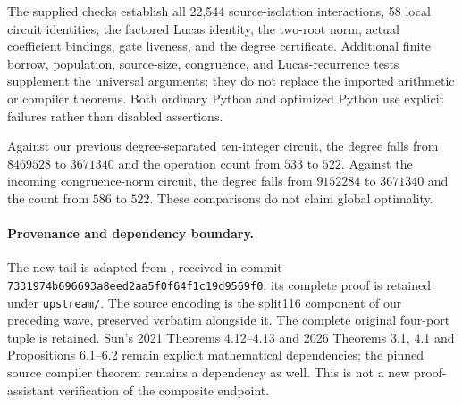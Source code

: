 The supplied checks establish all 22,544 source-isolation interactions, 58 local circuit identities, the factored Lucas identity, the two-root norm, actual coefficient bindings, gate liveness, and the degree certificate. Additional finite borrow, population, source-size, congruence, and Lucas-recurrence tests supplement the universal arguments; they do not replace the imported arithmetic or compiler theorems. Both ordinary Python and optimized Python use explicit failures rather than disabled assertions.

Against our previous degree-separated ten-integer circuit, the degree falls from $8469528$ to $3671340$ and the operation count from $533$ to $522$. Against the incoming congruence-norm circuit, the degree falls from $9152284$ to $3671340$ and the count from $586$ to $522$. These comparisons do not claim global optimality.

\paragraph{Provenance and dependency boundary.}
The new tail is adapted from , received in commit \texttt{7331974b696693a8eed2\allowbreak aa5f0f64f1c19d9569f0}; its complete proof is retained under \texttt{upstream/}. The source encoding is the split116 component of our preceding wave, preserved verbatim alongside it. The complete original four-port tuple is retained. Sun's 2021 Theorems 4.12--4.13 and 2026 Theorems 3.1, 4.1 and Propositions 6.1--6.2 remain explicit mathematical dependencies; the pinned source compiler theorem remains a dependency as well. This is not a new proof-assistant verification of the composite endpoint.

